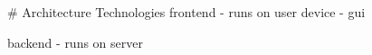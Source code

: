 \begin{markdown}


# Architecture Technologies
frontend
- runs on user device
- gui

backend
- runs on server



\end{markdown}
